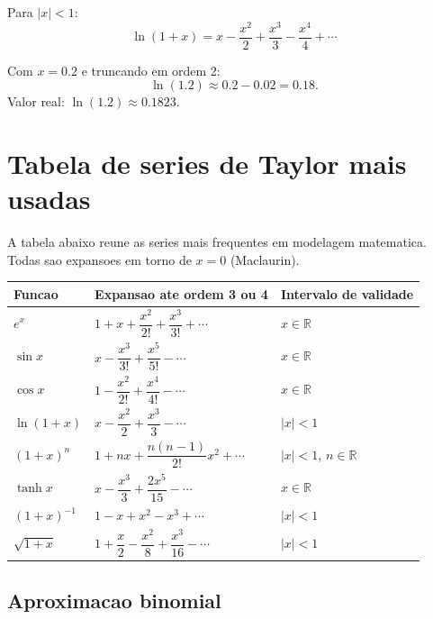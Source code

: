 \documentclass[12pt,a4paper,oneside]{book}
\theoremstyle{definition}
\begin{document}
Para $|x|<1$:
\begin{equation}
\ln(1+x)=x-\frac{x^2}{2}+\frac{x^3}{3}-\frac{x^4}{4}+\cdots
\end{equation}

Com $x=0.2$ e truncando em ordem 2:
\begin{equation}
\ln(1.2) \approx 0.2 - 0.02 = 0.18.
\end{equation}
Valor real: $\ln(1.2)\approx 0.1823$.

\section{Tabela de series de Taylor mais usadas}

A tabela abaixo reune as series mais frequentes em modelagem matematica.
Todas sao expansoes em torno de $x=0$ (Maclaurin).

\begin{center}
\begin{tabular}{lll}
\toprule
\textbf{Funcao} & \textbf{Expansao ate ordem 3 ou 4} & \textbf{Intervalo de validade} \\
\midrule
$e^x$           & $1 + x + \dfrac{x^2}{2!} + \dfrac{x^3}{3!} + \cdots$ & $x \in \mathbb{R}$ \\[6pt]
$\sin x$        & $x - \dfrac{x^3}{3!} + \dfrac{x^5}{5!} - \cdots$ & $x \in \mathbb{R}$ \\[6pt]
$\cos x$        & $1 - \dfrac{x^2}{2!} + \dfrac{x^4}{4!} - \cdots$ & $x \in \mathbb{R}$ \\[6pt]
$\ln(1+x)$      & $x - \dfrac{x^2}{2} + \dfrac{x^3}{3} - \cdots$ & $|x| < 1$ \\[6pt]
$(1+x)^n$       & $1 + nx + \dfrac{n(n-1)}{2!}x^2 + \cdots$ & $|x| < 1$, $n \in \mathbb{R}$ \\[6pt]
$\tanh x$       & $x - \dfrac{x^3}{3} + \dfrac{2x^5}{15} - \cdots$ & $x \in \mathbb{R}$ \\[6pt]
$(1+x)^{-1}$    & $1 - x + x^2 - x^3 + \cdots$ & $|x| < 1$ \\[6pt]
$\sqrt{1+x}$    & $1 + \dfrac{x}{2} - \dfrac{x^2}{8} + \dfrac{x^3}{16} - \cdots$ & $|x| < 1$ \\[6pt]
\bottomrule
\end{tabular}
\end{center}

\subsection{Aproximacao binomial}
\end{document}

